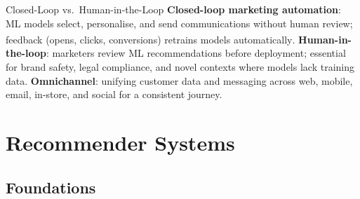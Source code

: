 \begin{v3topic}{Closed-Loop vs.\ Human-in-the-Loop}
    \textbf{Closed-loop marketing automation}: ML models select, personalise, and send communications without human review; feedback (opens, clicks, conversions) retrains models automatically\textsuperscript{\cite[][pp.~200--205]{chaffeyDigitalBusinessECommerce2019}}.
    \textbf{Human-in-the-loop}: marketers review ML recommendations before deployment; essential for brand safety, legal compliance, and novel contexts where models lack training data.
    \textbf{Omnichannel}: unifying customer data and messaging across web, mobile, email, in-store, and social for a consistent journey.

\end{v3topic}

\section{Recommender Systems}

\subsection{Foundations}


